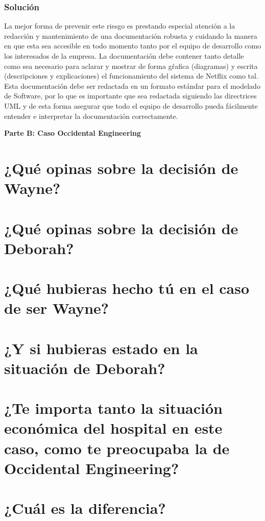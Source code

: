 \documentclass{article}
\newcommand*\rbreak{\par\noindent\linebreak}
\begin{document}
\subsubsection{Solución}
La mejor forma de prevenir este riesgo es prestando especial 
atención a la redacción y mantenimiento de una documentación robusta
y cuidando la manera en que esta sea accesible en todo momento
tanto por el equipo de desarrollo como los interesados de la 
empresa. La documentación debe contener tanto detalle como sea 
necesario para aclarar y mostrar de forma gŕafica (diagramas) y 
escrita (descripciones y explicaciones) el funcionamiento del sistema
de Netflix como tal. Esta documentación debe ser redactada en un 
formato estándar para el modelado de Software, por lo que es
importante que sea redactada siguiendo las directrices UML y de esta
forma asegurar que todo el equipo de desarrollo pueda fácilmente 
entender e interpretar la documentación correctamente.

\clearpage\textbf{\huge{Parte B: Caso Occidental Engineering}}\rbreak
\section{¿Qué opinas sobre la decisión de Wayne?}
\section{¿Qué opinas sobre la decisión de Deborah?}
\section{¿Qué hubieras hecho tú en el caso de ser Wayne?}
\section{¿Y si hubieras estado en la situación de Deborah?}
\section{¿Te importa tanto la situación económica del hospital
        en este caso, como te preocupaba la de Occidental
        Engineering?}
\section{¿Cuál es la diferencia?}
\end{document}
